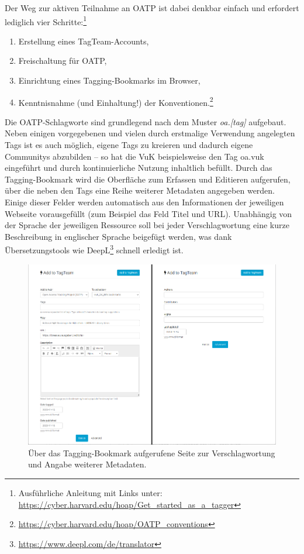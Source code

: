 \documentclass[a4paper,
fontsize=11pt,
oneside,
numbers=noperiodatend,
parskip=half-,
bibliography=totoc,
final
]{scrartcl}
\begin{document}
Der Weg zur aktiven Teilnahme an OATP ist dabei denkbar einfach und
erfordert lediglich vier Schritte:\footnote{Ausführliche Anleitung mit
  Links unter:
  \url{https://cyber.harvard.edu/hoap/Get_started_as_a_tagger}}

\begin{enumerate}
\def\labelenumi{\arabic{enumi}.}
\item
  Erstellung eines TagTeam-Accounts,
\item
  Freischaltung für OATP,
\item
  Einrichtung eines Tagging-Bookmarks im Browser,
\item
  Kenntnisnahme (und Einhaltung!) der Konventionen.\footnote{\url{https://cyber.harvard.edu/hoap/OATP_conventions}}
\end{enumerate}

Die OATP-Schlagworte sind grundlegend nach dem Muster
\emph{oa.{[}tag{]}} aufgebaut. Neben einigen vorgegebenen und vielen
durch erstmalige Verwendung angelegten Tags ist es auch möglich, eigene
Tags zu kreieren und dadurch eigene Communitys abzubilden -- so hat die
VuK beispielsweise den Tag oa.vuk eingeführt und durch kontinuierliche
Nutzung inhaltlich befüllt. Durch das Tagging-Bookmark wird die
Oberfläche zum Erfassen und Editieren aufgerufen, über die neben den
Tags eine Reihe weiterer Metadaten angegeben werden. Einige dieser
Felder werden automatisch aus den Informationen der jeweiligen Webseite
vorausgefüllt (zum Beispiel das Feld Titel und URL). Unabhängig von der
Sprache der jeweiligen Ressource soll bei jeder Verschlagwortung eine
kurze Beschreibung in englischer Sprache beigefügt werden, was dank
Übersetzungstools wie DeepL\footnote{\url{https://www.deepl.com/de/translator}}
schnell erledigt ist.

\begin{figure}
\centering
\includegraphics{img_1.png}
\caption{Über das Tagging-Bookmark aufgerufene Seite zur
Verschlagwortung und Angabe weiterer Metadaten.}
\end{figure}
\end{document}
